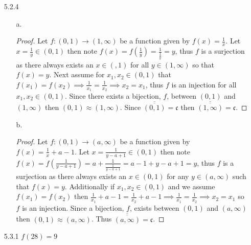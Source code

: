 \documentclass[11pt]{amsart}
\theoremstyle{definition}
\begin{document}
\begin{itemize}
\begin{itemize}
\end{itemize}

\item[5.2.4]
\begin{itemize}
	\item[a.] \begin{proof}
		Let $f:(0,1)\to(1,\infty)$ be a function given by $f(x)=\frac1{x}$. Let $x=\frac1y\in(0,1)$ then note $f(x)=f(\frac1y)=\frac1{\frac1y}=y$, thus $f$ is a surjection as there always exists an $x\in(,1)$ for all $y\in(1,\infty)$ so that $f(x)=y$. Next assume for $x_1,x_2\in(0,1)$ that $f(x_1)=f(x_2)\implies \frac1{x_1}=\frac1{x_2}\implies x_2=x_1$, thus $f$ is an injection for all $x_1,x_2\in(0,1)$. Since there exists a bijection, $f$, between $(0,1)$ and $(1,\infty)$ then $(0,1)\approx(1,\infty)$. Since $\overline{\overline{(0,1)}}=\mathfrak{c}$ then $\overline{\overline{(1,\infty)}}=\mathfrak{c}$.
	\end{proof}

	\item[b.] \begin{proof}
			Let $f:(0,1)\to(a,\infty)$ be a function given by $f(x)=\frac1x+a-1$. Let $x=\frac1{y-a+1}\in(0,1)$ then note $f(x)=f(\frac1{y-a+1})=a+\frac1{\frac1{y-a+1}}=a-1+y-a+1=y$, thus $f$ is a surjection as there always exists an $x\in(0,1)$ for any $y\in(a,\infty)$ such that $f(x)=y$. Additionally if $x_1,x_2\in(0,1)$ and we assume $f(x_1)=f(x_2)$ then $\frac1{x_1}+a-1=\frac1{x_2}+a-1\implies\frac1{x_1}=\frac1{x_2}\implies x_2=x_1$ so $f$ is an injection. Since a bijection, $f$, exists between $(0,1)$ and $(a,\infty)$ then $(0,1)\approx(a,\infty)$. Thus $\overline{\overline{(a,\infty)}}=\mathfrak{c}$.
	\end{proof}

\end{itemize}

\item[5.3.1] $f(28)=9$


\end{itemize}
\end{document}
